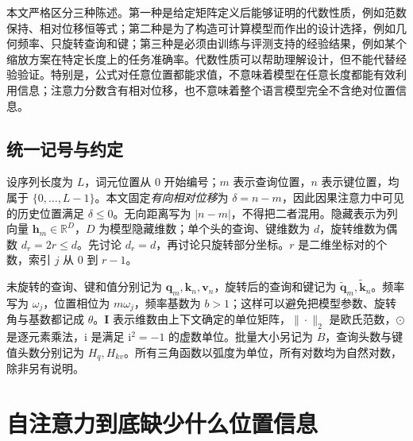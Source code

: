\documentclass[UTF8,12pt,a4paper,fontset=fandol]{ctexart}
\begin{document}
本文严格区分三种陈述。第一种是给定矩阵定义后能够证明的代数性质，例如范数保持、相对位移恒等式；第二种是为了构造可计算模型而作出的设计选择，例如几何频率、只旋转查询和键；第三种是必须由训练与评测支持的经验结果，例如某个缩放方案在特定长度上的任务准确率。代数性质可以帮助理解设计，但不能代替经验验证。特别是，公式对任意位置都能求值，不意味着模型在任意长度都能有效利用信息；注意力分数含有相对位移，也不意味着整个语言模型完全不含绝对位置信息。

\subsection{统一记号与约定}
设序列长度为 $L$，词元位置从 $0$ 开始编号；$m$ 表示查询位置，$n$ 表示键位置，均属于 $\{0,\ldots,L-1\}$。本文固定\emph{有向相对位移}为 $\delta=n-m$，因此因果注意力中可见的历史位置满足 $\delta\leq 0$。无向距离写为 $|n-m|$，不得把二者混用。隐藏表示为列向量 $\mathbf h_m\in\mathbb R^D$，$D$ 为模型隐藏维数；单个头的查询、键维数为 $d$，旋转维数为偶数 $d_r=2r\leq d$。先讨论 $d_r=d$，再讨论只旋转部分坐标。$r$ 是二维坐标对的个数，索引 $j$ 从 $0$ 到 $r-1$。

未旋转的查询、键和值分别记为 $\mathbf q_m,\mathbf k_n,\mathbf v_n$，旋转后的查询和键记为 $\widetilde{\mathbf q}_m,\widetilde{\mathbf k}_n$。频率写为 $\omega_j$，位置相位为 $m\omega_j$，频率基数为 $b>1$；这样可以避免把模型参数、旋转角与基数都记成 $\theta$。$\mathbf I$ 表示维数由上下文确定的单位矩阵，$\|\cdot\|_2$ 是欧氏范数，$\odot$ 是逐元素乘法，$\mathrm i$ 是满足 $\mathrm i^2=-1$ 的虚数单位。批量大小另记为 $B$，查询头数与键值头数分别记为 $H_q,H_{kv}$。所有三角函数以弧度为单位，所有对数均为自然对数，除非另有说明。

\section{自注意力到底缺少什么位置信息}
\label{sec:rope-attention}
\end{document}

